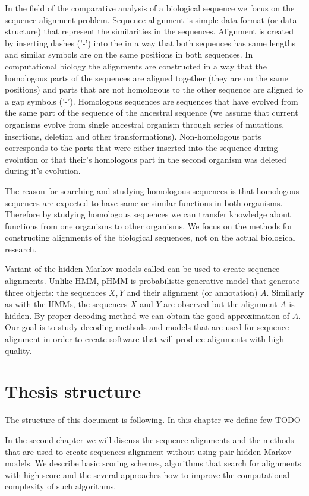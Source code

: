 In the field of the comparative analysis of a biological sequence we focus on the
sequence alignment problem. Sequence alignment is simple data format (or data
structure) that represent the similarities in the sequences. Alignment is
created by inserting dashes ('-') into the in a way that both sequences has same
lengths and similar symbols are on the same positions in both sequences. In
computational biology the alignments are constructed in a way that the
homologous parts of the sequences are aligned together (they are on the same
positions) and parts that are not homologous to the other sequence are aligned
to a gap symbols ('-'). Homologous sequences are sequences that have evolved
from the same part of the sequence of the ancestral sequence (we assume that
current organisms evolve from single ancestral organism through series of 
mutations, insertions, deletion and other transformations).
Non-homologous parts corresponds to the parts that were either inserted into 
the sequence during evolution or that their's homologous part in the second
organism was deleted during it's evolution.

The reason for searching and studying homologous sequences is that homologous
sequences are expected to have same or similar functions in both organisms.
Therefore by studying homologous sequences we can transfer knowledge about
functions from one organisms to other organisms. We focus on the methods for
constructing alignments of the biological sequences, not on the actual
biological research.

Variant of the hidden Markov models called  can be used to create sequence alignments. Unlike HMM, pHMM is
probabilistic generative model that generate three objects: the sequences $X,Y$
and their alignment (or annotation) $A$. Similarly as with the HMMs, the
sequences $X$ and $Y$ are observed but the alignment $A$ is hidden. By proper
decoding method we can obtain the good approximation of $A$. Our goal is to
study decoding methods and models that are used for sequence alignment in order
to create software that will produce alignments with high quality.

\section{Thesis structure}

The structure of this document is following. In this chapter we define few  TODO

In the second chapter we will discuss the sequence alignments and the methods
that are used to create sequences alignment without using pair hidden Markov
models. We describe basic scoring schemes, algorithms that search for alignments
with high score and the several approaches how to improve the computational
complexity of such algorithms.

